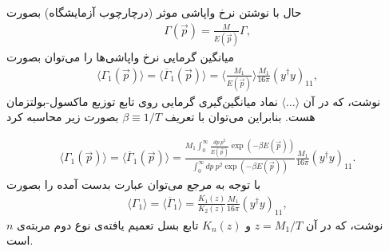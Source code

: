 \documentclass[a4paper]{book}
\begin{document}
حال با نوشتن نرخ واپاشی  موثر (درچارچوب آزمایشگاه) بصورت
{\footnotesize\begin{align}
		\Gamma(\vec{p})=\frac{M}{E(\vec{p})}\Gamma,
\end{align}}
میانگین گرمایی نرخ واپاشی‌ها را می‌توان بصورت
{\footnotesize\begin{align}
	\langle\Gamma_1(\vec{p})\rangle=\langle\overline{\Gamma}_1(\vec{p})\rangle=\langle\frac{M_1}{E(\vec{p})}\rangle\frac{M_1}{16 \pi} \left(y^{\dagger} y\right)_{11},
	\label{eq:average-decay-rate}
\end{align}}
نوشت، که در آن {\footnotesize$\langle\dots\rangle$} نماد میانگین‌گیری گرمایی روی تابع توزیع ماکسول-بولتزمان هست. بنابراین می‌توان با تعریف {\footnotesize$\beta \equiv 1/T$} بصورت زیر محاسبه کرد
\par
\vspace{-0.5cm}
{\footnotesize\begin{align}
	\langle\Gamma_1(\vec{p})\rangle=\langle\overline{\Gamma}_1(\vec{p})\rangle=
	\frac{M_1 \int_{0}^{\infty} \frac{dp\ p^2}{E(\vec{p})} \exp(-\beta E(\vec{p}))}{\int_{0}^{\infty}dp\ p^2 \exp(-\beta E(\vec{p}))}
	\frac{M_1}{16 \pi} \left(y^{\dagger} y\right)_{11}.
\end{align}}
با توجه به مرجع \cite{Kolb:1979qa} می‌توان عبارت بدست آمده را بصورت
{\footnotesize\begin{align}
	\langle\Gamma_1\rangle=\langle\overline{\Gamma}_1\rangle= \frac{K_1(z)}{K_2(z)} \frac{M_1}{16 \pi} \left(y^{\dagger} y\right)_{11},
	\label{eq:avaraged-decay-rate}
\end{align}}
نوشت، که در آن {\footnotesize$z=M_1/T$} و {\footnotesize$K_n(z)$} تابع بسل تعمیم یافته‌ی نوع دوم مربته‌ی {\footnotesize$n$} است.
\end{document}
